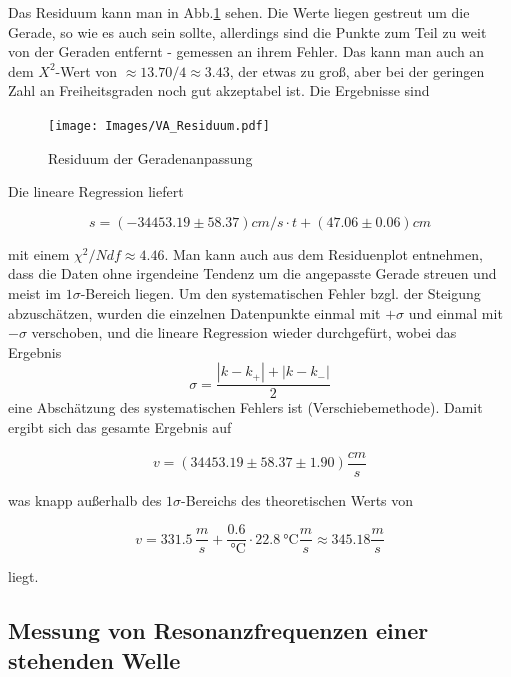 \documentclass[]{article}
\begin{document}
	Das Residuum kann man in Abb.\ref{Va_Res} sehen. Die Werte liegen gestreut um die Gerade, so wie es auch sein sollte, allerdings sind die Punkte zum Teil zu weit von der Geraden entfernt - gemessen an ihrem Fehler. Das kann man auch an dem $X^2$-Wert von $\approx13.70/4\approx3.43$, der etwas zu groß, aber bei der geringen Zahl an Freiheitsgraden noch gut akzeptabel ist.
	Die Ergebnisse sind 



	\begin{figure}
	\begin{center}
		\texttt{[image: Images/VA\_Residuum.pdf]}
		\caption{Residuum der Geradenanpassung}
		\label{Va_Res}
	\end{center}
	\end{figure}
	
Die lineare Regression liefert

\begin{equation*}
s = (-34453.19\pm58.37) cm/s\cdot t+ (47.06\pm0.06)cm
\end{equation*}

mit einem $\chi^2/Ndf \approx 4.46$. Man kann auch aus dem Residuenplot entnehmen, dass die Daten ohne irgendeine Tendenz um die angepasste Gerade streuen und meist im $1\sigma$-Bereich liegen. Um den systematischen Fehler bzgl. der Steigung abzuschätzen, wurden die einzelnen Datenpunkte einmal mit $+\sigma$ und einmal mit $-\sigma$ verschoben, und die lineare Regression wieder durchgefürt, wobei das Ergebnis
\begin{equation}
	\sigma = \frac{|k-k_+|+|k-k_-|}{2}
\end{equation}
eine Abschätzung des systematischen Fehlers ist (Verschiebemethode). Damit ergibt sich das gesamte Ergebnis auf

\begin{equation*}
	v = (34453.19\pm58.37\pm1.90) \frac{cm}{s}
\end{equation*}

was knapp außerhalb des $1\sigma$-Bereichs des theoretischen Werts von

\begin{equation*}
v = 331.5 \, \frac{m}{s} +\frac{0.6}{\SI{} {\celsius}} \cdot \SI{22.8}{\celsius} \frac{m}{s} \approx 345.18 \frac{m}{s}
\end{equation*}

liegt.

	
	\subsection{Messung von Resonanzfrequenzen einer stehenden Welle}
\end{document}
